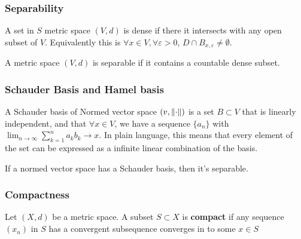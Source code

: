 \subsubsection{Separability}

\begin{definition}[dense]\rm
	A set in $S$ metric space $(V,d)$ is dense if there it intersects with any open subset of $V$. Equivalently this is $\forall x\in V,\forall \varepsilon>0$, $D\cap B_{x,\varepsilon}\neq \emptyset$.
\end{definition}


\begin{definition}[separable]\rm
	A metric space $(V,d)$ is separable if it contains a countable dense subset.
\end{definition}

\begin{example}\label{separable space example}
\end{example}

\subsubsection{Schauder Basis and Hamel basis}

\begin{definition}\label{Schauder basis}\rm
	A Schauder basis of Normed vector space $(v,\left\|{\cdot}\right\|)$ is a set $B\subset V$ that is linearly independent, and that $\forall x\in V$, we have a sequence $\{a_n\}$ with $\lim_{n\to\infty}\sum_{k=1}^n a_k b_k\to x$. In plain language, this means that every element of the set can be expressed as a infinite linear combination of the basis.
\end{definition}


\begin{proposition}\rm\nextline
	If a normed vector space has a Schauder basis, then it's separable.
\end{proposition}

\begin{definition}\rm\nextline
	\placeholder
\end{definition}

\begin{remark}\rm\nextline
	\placeholder
\end{remark}

\subsubsection{Compactness}
\begin{definition}[Compactness]\label{compactness}\rm\nextline
	Let $(X,d)$ be a metric space. A subset $S\subset X$ is {\bf compact} if any sequence $(x_n)$ in $S$ has a convergent subsequence converges in to some $x\in S$
\end{definition}


